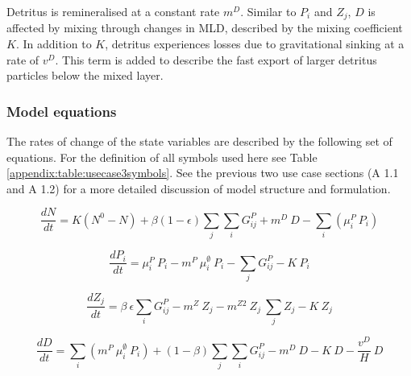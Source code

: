 \documentclass[journal abbreviations, manuscript]{copernicus}
\begin{document}
Detritus is remineralised at a constant rate $m^D$. Similar to $P_i$ and $Z_j$, $D$ is affected by mixing through changes in MLD, described by the mixing coefficient $K$. In addition to $K$, detritus experiences losses due to gravitational sinking at a rate of $v^D$. This term is added to describe the fast export of larger detritus particles below the mixed layer. 

\clearpage
\subsubsection{Model equations}
The rates of change of the state variables are described by the following set of equations. For the definition of all symbols used here see Table \ref{appendix:table:usecase3symbols}.
See the previous two use case sections (A 1.1 and A 1.2) for a more detailed discussion of model structure and formulation. 


\begin{equation}
    \frac{d N}{d t} = 
    K (N^0 - N) %
    +  \beta(1 - \epsilon)\sum_{j} \sum_{i} G_{ij}^P %
    +  m^D \ D %
    - \sum_{i} ( \mu_i^{P} \  P_i) %
\end{equation}

\begin{equation}
    \frac{d P_i}{d t} =
    \mu_i^{P} \   P_i  %
    - m^P  \ \mu_i^{\emptyset} \ P_i %
    - \sum_{j} G_{ij}^P %
    - K \ P_i%
\end{equation}

\begin{equation}
    \frac{d Z_j}{d t} =
    \beta \ \epsilon  \sum_{i} G_{ij}^P %
    - m^{Z} \ Z_j  %
    - m^{Z2} \ Z_j \ \sum_{j} Z_j  %
    - K \ Z_j %
\end{equation}

\begin{equation}
    \frac{d D}{d t} = 
    \sum_{i}(m^P  \ \mu_i^{\emptyset} \  P_i) %
    + (1 - \beta) \sum_{j} \sum_{i} G_{ij}^P %
    - m^D \ D %
    - K \ D %
    - \frac{v^D}{H} \ D %
\end{equation}
\end{document}
